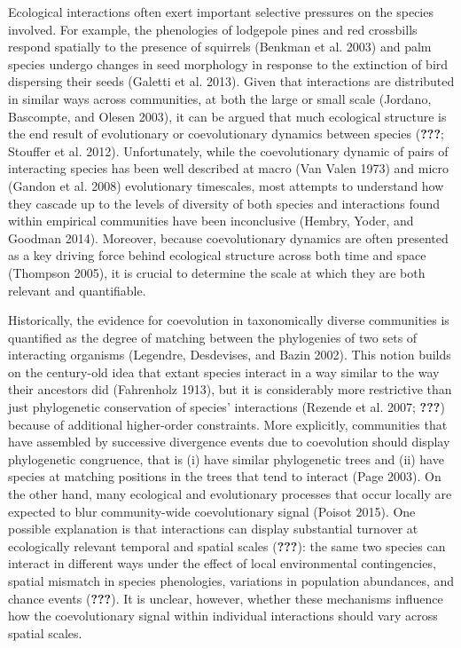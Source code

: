 \documentclass[12pt]{article}
\begin{document}
Ecological interactions often exert important selective pressures on the
species involved. For example, the phenologies of lodgepole pines and
red crossbills respond spatially to the presence of squirrels (Benkman
et al. 2003) and palm species undergo changes in seed morphology in
response to the extinction of bird dispersing their seeds (Galetti et
al. 2013). Given that interactions are distributed in similar ways
across communities, at both the large or small scale (Jordano,
Bascompte, and Olesen 2003), it can be argued that much ecological
structure is the end result of evolutionary or coevolutionary dynamics
between species ({\textbf{???}}; Stouffer et al. 2012). Unfortunately,
while the coevolutionary dynamic of pairs of interacting species has
been well described at macro (Van Valen 1973) and micro (Gandon et al.
2008) evolutionary timescales, most attempts to understand how they
cascade up to the levels of diversity of both species and interactions
found within empirical communities have been inconclusive (Hembry,
Yoder, and Goodman 2014). Moreover, because coevolutionary dynamics are
often presented as a key driving force behind ecological structure
across both time and space (Thompson 2005), it is crucial to determine
the scale at which they are both relevant and quantifiable.

Historically, the evidence for coevolution in taxonomically diverse
communities is quantified as the degree of matching between the
phylogenies of two sets of interacting organisms (Legendre, Desdevises,
and Bazin 2002). This notion builds on the century-old idea that extant
species interact in a way similar to the way their ancestors did
(Fahrenholz 1913), but it is considerably more restrictive than just
phylogenetic conservation of species' interactions (Rezende et al. 2007;
{\textbf{???}}) because of additional higher-order constraints. More
explicitly, communities that have assembled by successive divergence
events due to coevolution should display phylogenetic congruence, that
is (i) have similar phylogenetic trees and (ii) have species at matching
positions in the trees that tend to interact (Page 2003). On the other
hand, many ecological and evolutionary processes that occur locally are
expected to blur community-wide coevolutionary signal (Poisot 2015). One
possible explanation is that interactions can display substantial
turnover at ecologically relevant temporal and spatial scales
({\textbf{???}}): the same two species can interact in different ways
under the effect of local environmental contingencies, spatial mismatch
in species phenologies, variations in population abundances, and chance
events ({\textbf{???}}). It is unclear, however, whether these
mechanisms influence how the coevolutionary signal within individual
interactions should vary across spatial scales.
\end{document}
